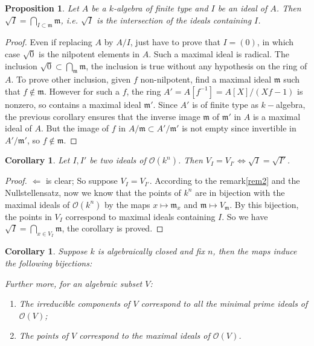 \documentclass[12pt,a4paper,english]{article}
\theoremstyle{plain}
\newtheorem{prop}[thm]{Proposition}
\newtheorem{coro}[thm]{Corollary}
\theoremstyle{definition}
\theoremstyle{remark}
\begin{document}
\begin{prop}
Let $A$ be a $k$-algebra of finite type and $I$ be an ideal of $A$. Then $\sqrt{I}=\bigcap_{I\subset\mathfrak{m}}\mathfrak{m}$, i.e. $\sqrt{I}$ is the intersection of the ideals containing $I$.
\end{prop}
\begin{proof}
Even if replacing $A$ by $A/I$, just have to prove that  $I=(0)$, in which case $\sqrt{0}$ is the nilpotent elements in $A$. Such a maximal ideal is radical. The inclusion $\sqrt{0}\subset \bigcap_{\mathfrak{m}}\mathfrak{m}$, the inclusion is true without any hypothesis on the ring of $A$. To prove other inclusion, given $f$ non-nilpotent, find a maximal ideal $\mathfrak{m}$ such that $f\not\in\mathfrak{m}$.  However for such a $f$, the ring $A'=A[f^{-1}]=A[X]/(Xf-1)$ is nonzero, so contains a maximal ideal $\mathfrak{m'}$. Since $A'$ is of finite type as $k-$algebra, the previous corollary ensures that the inverse image $\mathfrak{m}$ of $\mathfrak{m'}$ in $A$ is a maximal ideal of $A$. But the image of $f$ in $A/\mathfrak{m}\subset A'/\mathfrak{m'}$ is not empty since invertible in $A'/\mathfrak{m'}$, so $f\not\in \mathfrak{m}$. 
\end{proof}
\begin{coro}
Let $I, I'$ be two ideals of $\mathcal{O}(k^{n})$. Then $V_{I}=V_{I'}\Leftrightarrow \sqrt{I}=\sqrt{I'}$.
\end{coro}
\begin{proof}
$\Leftarrow$ is clear; So suppose $V_{I}=V_{I'}$. According to the remark\ref{rem2} and the Nullstellensatz, now we know that the points of $k^{n}$ are in bijection with the maximal ideals of $\mathcal{O}(k^{n})$ by the maps $x\mapsto \mathfrak{m}_{x}$ and $\mathfrak{m}\mapsto V_{\mathfrak{m}}$. By this bijection, the points in $V_{I}$ correspond to maximal ideals containing  $I$. So we have $\sqrt{I}=\bigcap_{x\in V_{I}}\mathfrak{m}$, the corollary is proved.

\end{proof}
\begin{coro}
Suppose $k$ is algebraically closed and fix $n$, then the maps induce the following bijections:
\begin{center}
\end{center}
Further more, for an algebraic subset $V$:
\begin{enumerate}
    \item[-] The irreducible components of $V$ correspond to all the minimal prime ideals of $\mathcal{O}(V)$;
    \item[-] The points of $V$ correspond to the maximal ideals of $\mathcal{O}(V)$. 
\end{enumerate}
\end{coro}
\end{document}
